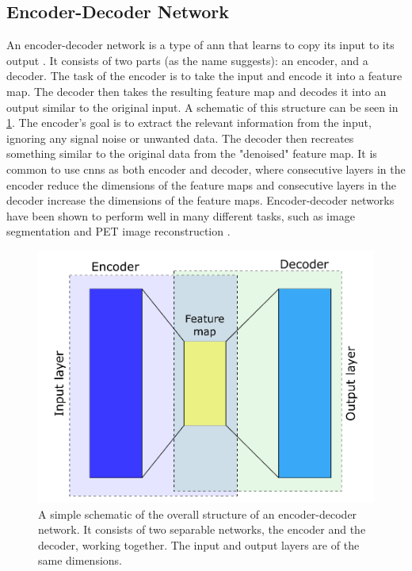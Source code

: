 \subsection{Encoder-Decoder Network}
\label{sec:ml:types:encoderdecoder}
An encoder-decoder network is a type of \gls{ann} that learns to copy its input to its output \cite{https://doi.org/10.1002/aic.690370209}. It consists of two parts (as the name suggests): an encoder, and a decoder. The task of the encoder is to take the input and encode it into a feature map. The decoder then takes the resulting feature map and decodes it into an output similar to the original input. A schematic of this structure can be seen in \cref{fig:encoderdecoder}. The encoder's goal is to extract the relevant information from the input, ignoring any signal noise or unwanted data. The decoder then recreates something similar to the original data from the "denoised" feature map. It is common to use \gls{cnn}s as both encoder and decoder, where consecutive layers in the encoder reduce the dimensions of the feature maps and consecutive layers in the decoder increase the dimensions of the feature maps. Encoder-decoder networks have been shown to perform well in many different tasks, such as image segmentation \cite{7803544} and PET image reconstruction \cite{HAGGSTROM2019253}.  

\begin{figure}[htbp]  
    \centering
    \includegraphics[width=.7\textwidth]{figures/encoderdecoder.pdf}
    \caption[Encoder-decoder network]{A simple schematic of the overall structure of an encoder-decoder network. It consists of two separable networks, the encoder and the decoder, working together. The input and output layers are of the same dimensions. }
    \label{fig:encoderdecoder}
\end{figure}

